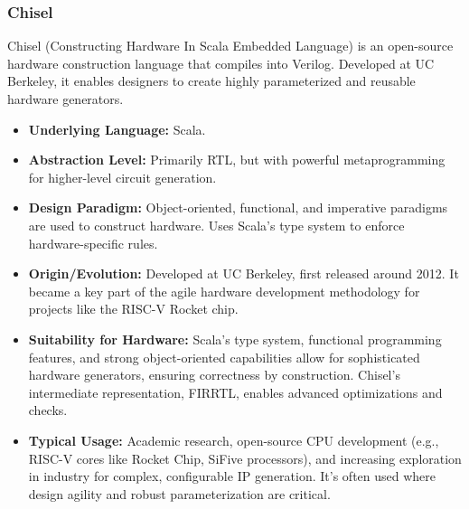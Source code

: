 \documentclass[sigconf, anonymous=false]{acmart} %
\begin{document}
\subsubsection{Chisel}
Chisel (Constructing Hardware In Scala Embedded Language)\cite{Bachrach2012} is an open-source hardware construction language that compiles into Verilog. Developed at UC Berkeley, it enables designers to create highly parameterized and reusable hardware generators.
\begin{itemize}
    \item \textbf{Underlying Language:} Scala.
    \item \textbf{Abstraction Level:} Primarily RTL, but with powerful metaprogramming for higher-level circuit generation.
    \item \textbf{Design Paradigm:} Object-oriented, functional, and imperative paradigms are used to construct hardware. Uses Scala's type system to enforce hardware-specific rules.
    \item \textbf{Origin/Evolution:} Developed at UC Berkeley, first released around 2012. It became a key part of the agile hardware development methodology for projects like the RISC-V Rocket chip.
    \item \textbf{Suitability for Hardware:} Scala's type system, functional programming features, and strong object-oriented capabilities allow for sophisticated hardware generators, ensuring correctness by construction. Chisel's intermediate representation, FIRRTL, enables advanced optimizations and checks.
    \item \textbf{Typical Usage:} Academic research, open-source CPU development (e.g., RISC-V cores like Rocket Chip, SiFive processors), and increasing exploration in industry for complex, configurable IP generation. It's often used where design agility and robust parameterization are critical.
\end{itemize}
\end{document}
